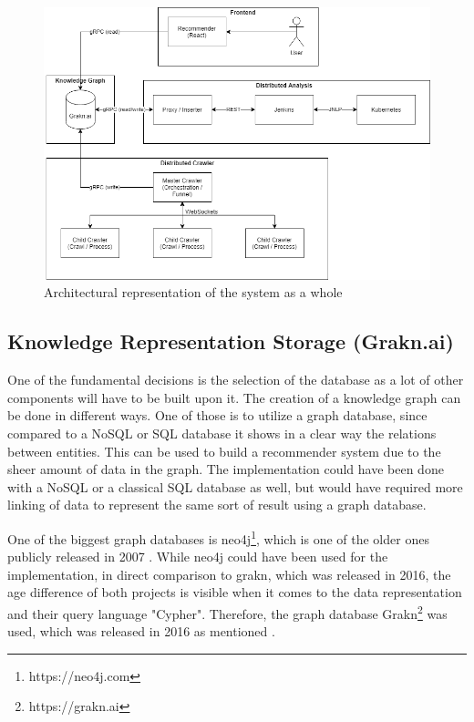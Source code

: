 \begin{figure}[H]
    \centering
    \includegraphics[scale=0.5]{graphics/architecture_v3.png}
    \caption{Architectural representation of the system as a whole}
    \label{fig:architecture}
\end{figure}

\subsection{Knowledge Representation Storage (Grakn.ai)}
\label{sec:database}
One of the fundamental decisions is the selection of the database as a lot of other components will have to be built upon it. The creation of a knowledge graph can be done in different ways. One of those is to utilize a graph database, since compared to a NoSQL or SQL database it shows in a clear way the relations between entities. This can be used to build a recommender system due to the sheer amount of data in the graph. The implementation could have been done with a NoSQL or a classical SQL database as well, but would have required more linking of data to represent the same sort of result using a graph database.


One of the biggest graph databases is neo4j\footnote{https://neo4j.com}, which is one of the older ones publicly released in 2007 \cite{graphdb}. While neo4j could have been used for the implementation, in direct comparison to grakn, which was released in 2016, the age difference of both projects is visible when it comes to the data representation and their query language "Cypher". Therefore, the graph database Grakn\footnote{https://grakn.ai} was used, which was released in 2016 as mentioned \cite{graknRelease}.

